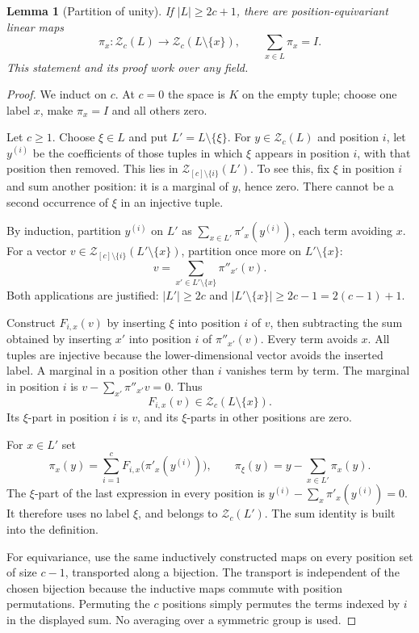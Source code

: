 \documentclass[11pt,a4paper,oneside,openany]{book}
\newtheorem{lemma}[theorem]{Lemma}
\theoremstyle{definition}\newtheorem{definition}[theorem]{Definition}
\theoremstyle{remark}\newtheorem{remark}[theorem]{Remark}
\numberwithin{equation}{chapter}
\begin{document}
\begin{lemma}[Partition of unity]\label{tx:lem:unity}
If $|L|\ge2c+1$, there are position-equivariant linear maps
\[\pi_x:\mathcal Z_c(L)\longrightarrow \mathcal Z_c(L\setminus\{x\}),\qquad
\sum_{x\in L}\pi_x=I.
\]
This statement and its proof work over any field.
\end{lemma}
\begin{proof}
We induct on $c$. At $c=0$ the space is $K$ on the empty tuple; choose one label $x$, make $\pi_x=I$ and all others zero.

Let $c\ge1$. Choose $\xi\in L$ and put $L'=L\setminus\{\xi\}$. For $y\in \mathcal Z_c(L)$ and position $i$, let $y^{(i)}$ be the coefficients of those tuples in which $\xi$ appears in position $i$, with that position then removed. This lies in $\mathcal Z_{[c]\setminus\{i\}}(L')$. To see this, fix $\xi$ in position $i$ and sum another position: it is a marginal of $y$, hence zero. There cannot be a second occurrence of $\xi$ in an injective tuple.

By induction, partition $y^{(i)}$ on $L'$ as $\sum_{x\in L'}\pi'_x(y^{(i)})$, each term avoiding $x$. For a vector $v\in \mathcal Z_{[c]\setminus\{i\}}(L'\setminus\{x\})$, partition once more on $L'\setminus\{x\}$:
\[v=\sum_{x'\in L'\setminus\{x\}}\pi''_{x'}(v).
\]
Both applications are justified: $|L'|\ge2c$ and $|L'\setminus\{x\}|\ge2c-1=2(c-1)+1$.

Construct $F_{i,x}(v)$ by inserting $\xi$ into position $i$ of $v$, then subtracting the sum obtained by inserting $x'$ into position $i$ of $\pi''_{x'}(v)$. Every term avoids $x$. All tuples are injective because the lower-dimensional vector avoids the inserted label. A marginal in a position other than $i$ vanishes term by term. The marginal in position $i$ is $v-\sum_{x'}\pi''_{x'}v=0$. Thus
\[F_{i,x}(v)\in \mathcal Z_c(L\setminus\{x\}).
\]
Its $\xi$-part in position $i$ is $v$, and its $\xi$-parts in other positions are zero.

For $x\in L'$ set
\[\pi_x(y)=\sum_{i=1}^cF_{i,x}\bigl(\pi'_x(y^{(i)})\bigr),\qquad
\pi_\xi(y)=y-\sum_{x\in L'}\pi_x(y).
\]
The $\xi$-part of the last expression in every position is $y^{(i)}-\sum_x\pi'_x(y^{(i)})=0$. It therefore uses no label $\xi$, and belongs to $\mathcal Z_c(L')$. The sum identity is built into the definition.

For equivariance, use the same inductively constructed maps on every position set of size $c-1$, transported along a bijection. The transport is independent of the chosen bijection because the inductive maps commute with position permutations. Permuting the $c$ positions simply permutes the terms indexed by $i$ in the displayed sum. No averaging over a symmetric group is used.
\end{proof}
\end{document}
